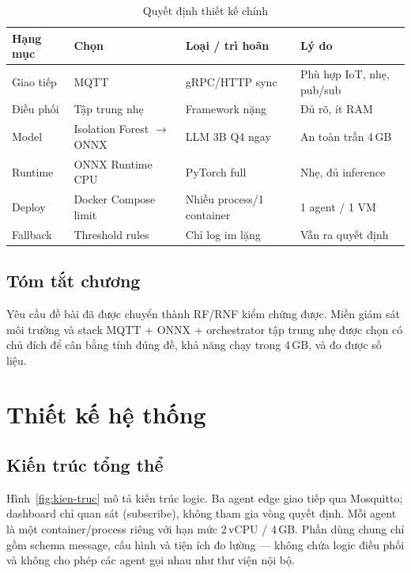\documentclass[12pt,a4paper,oneside]{report}
\begin{document}
\begin{table}[htbp]
  \centering
  \caption{Quyết định thiết kế chính}
  \label{tab:quyet-dinh-tk}
  \begin{tabular}{p{2.1cm}p{3.3cm}p{3.5cm}p{3.6cm}}
    \toprule
    \textbf{Hạng mục} & \textbf{Chọn} & \textbf{Loại / trì hoãn} & \textbf{Lý do} \\
    \midrule
    Giao tiếp & MQTT & gRPC/HTTP sync & Phù hợp IoT, nhẹ, pub/sub \\
    Điều phối & Tập trung nhẹ & Framework nặng & Đủ rõ, ít RAM \\
    Model & Isolation Forest $\rightarrow$ ONNX & LLM 3B Q4 ngay & An toàn trần 4\,GB \\
    Runtime & ONNX Runtime CPU & PyTorch full & Nhẹ, đủ inference \\
    Deploy & Docker Compose limit & Nhiều process/1 container & 1 agent / 1 VM \\
    Fallback & Threshold rules & Chỉ log im lặng & Vẫn ra quyết định \\
    \bottomrule
  \end{tabular}
\end{table}

\section{Tóm tắt chương}

Yêu cầu đề bài đã được chuyển thành RF/RNF kiểm chứng được. Miền giám sát môi trường và stack MQTT + ONNX + orchestrator tập trung nhẹ được chọn có chủ đích để cân bằng tính đúng đề, khả năng chạy trong 4\,GB, và đo được số liệu.

\chapter{Thiết kế hệ thống}

\section{Kiến trúc tổng thể}

Hình~\ref{fig:kien-truc} mô tả kiến trúc logic. Ba agent edge giao tiếp qua Mosquitto; dashboard chỉ quan sát (subscribe), không tham gia vòng quyết định. Mỗi agent là một container/process riêng với hạn mức 2\,vCPU / 4\,GB. Phần dùng chung chỉ gồm schema message, cấu hình và tiện ích đo lường --- không chứa logic điều phối và không cho phép các agent gọi nhau như thư viện nội bộ.
\end{document}
